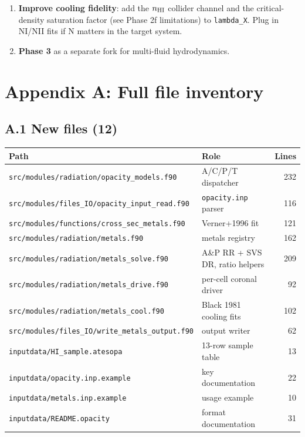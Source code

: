 \documentclass[english,a4paper]{kiseon_memo}
\begin{document}
\begin{enumerate}
\item \textbf{Improve cooling fidelity}: add the
$n_{\rm HI}$ collider channel and the critical-density saturation
factor (see Phase 2f limitations) to \texttt{lambda\_X}. Plug in
NI/NII fits if N matters in the target system.

\item \textbf{Phase 3} as a separate fork for multi-fluid hydrodynamics.
\end{enumerate}

\section*{Appendix A: Full file inventory}

\subsection*{A.1 New files (12)}

\begin{center}
\begin{tabular}{|l|p{6cm}|r|}
\hline
Path & Role & Lines \\
\hline
\texttt{src/modules/radiation/opacity\_models.f90}      & A/C/P/T dispatcher          & 232 \\
\texttt{src/modules/files\_IO/opacity\_input\_read.f90} & \texttt{opacity.inp} parser & 116 \\
\texttt{src/modules/functions/cross\_sec\_metals.f90}   & Verner+1996 fit             & 121 \\
\texttt{src/modules/radiation/metals.f90}               & metals registry             & 162 \\
\texttt{src/modules/radiation/metals\_solve.f90}        & A\&P RR + SVS DR, ratio helpers & 209 \\
\texttt{src/modules/radiation/metals\_drive.f90}        & per-cell coronal driver     &  92 \\
\texttt{src/modules/radiation/metals\_cool.f90}         & Black 1981 cooling fits     & 102 \\
\texttt{src/modules/files\_IO/write\_metals\_output.f90}& output writer               &  62 \\
\texttt{inputdata/HI\_sample.atesopa}                   & 13-row sample table         &  13 \\
\texttt{inputdata/opacity.inp.example}                  & key documentation           &  22 \\
\texttt{inputdata/metals.inp.example}                   & usage example               &  10 \\
\texttt{inputdata/README.opacity}                       & format documentation        &  31 \\
\hline
\end{tabular}
\end{center}
\end{document}

